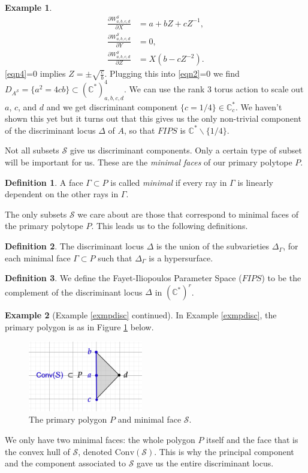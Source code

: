 \documentclass[oneside,reqno]{amsart}
\theoremstyle{definition}
\newtheorem{definition}{Definition}[section]
\theoremstyle{definition}
\theoremstyle{definition}
\newtheorem{example}{Example} [section]
\theoremstyle{definition}
\newcommand{\CC}{\mathbb{C}}
\begin{document}
\begin{example}
\begin{align}
        \label{eqn2}
        \frac{\partial W_{a,b,c,d}^{\mathcal{S}}}{\partial X} &= a + bZ +cZ^{-1}, \\
        \frac{\partial W_{a,b,c,d}^{\mathcal{S}}}{\partial Y} &=0, \\
        \label{eqn4}
        \frac{\partial W_{a,b,c,d}^{\mathcal{S}}}{\partial Z} &= X(b - cZ^{-2}).
    \end{align}
    \eqref{eqn4}=0 implies $Z = \pm \sqrt{\frac{c}{b}}$. Plugging this into \eqref{eqn2}=0 we find $D_{A^{\mathcal{S}}} = \{a^2 = 4 cb \}\subset (\CC^*)^{4}_{a,b,c,d}$. We can use the rank 3 torus action to scale out $a$, $c$, and $d$ and we get discriminant component $\{c=1/4 \} \in \CC^*_c$. We haven't shown this yet but it turns out that this gives us the only non-trivial component of the discriminant locus $\Delta$ of $A$, so that $FIPS$ is $\CC^* \backslash \{ 1/4 \} $.
\end{example}
Not all subsets $\mathcal{S}$ give us discriminant components. Only a certain type of subset will be important for us. These are the \textit{minimal faces} of our primary polytope $P$. 
\begin{definition}
    A face $\Gamma \subset P $ is called \textit{minimal} if every ray in $\Gamma$ is linearly dependent on the other rays in $\Gamma$.
\end{definition}
The only subsets $\mathcal{S}$ we care about are those that correspond to minimal faces of the primary polytope $P$. This leads us to the following definitions.
\begin{definition}
    The discriminant locus $\Delta$ is the union of the subvarieties $\Delta_{\Gamma}$, for each minimal face $\Gamma \subset P$ such that $\Delta_{\Gamma}$ is a hypersurface.
\end{definition}
\begin{definition}
    \label{FIPS}
    We define the Fayet-Iliopoulos Parameter Space ($FIPS$) to be the complement of the discriminant locus $\Delta$ in $(\CC^*)^r$.
\end{definition}
\begin{example} [Example \ref{exmpdisc} continued]
    In Example \ref{exmpdisc}, the primary polygon is as in Figure \ref{gkzcomponents} below.
    \begin{figure}[!h]
        \centering
        \includegraphics[width=5cm]{face&subspace/primary.png}
        \caption{The primary polygon $P$ and minimal face $\mathcal{S}$.}
        \label{gkzcomponents}
    \end{figure}
    We only have two minimal faces: the whole polygon $P$ itself and the face that is the convex hull of $\mathcal{S}$, denoted $\text{Conv}(\mathcal{S})$. This is why the principal component and the component associated to $\mathcal{S}$ gave us the entire discriminant locus.
\end{example} 
\end{document}
